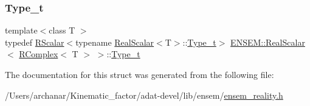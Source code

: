 \subsubsection{\texorpdfstring{Type\_t}{Type\_t}\hspace{0.1cm}{\footnotesize\ttfamily [3/3]}}
{\footnotesize\ttfamily template$<$class T $>$ \\
typedef \mbox{\hyperlink{classENSEM_1_1RScalar}{R\+Scalar}}$<$typename \mbox{\hyperlink{structENSEM_1_1RealScalar}{Real\+Scalar}}$<$T$>$\+::\mbox{\hyperlink{structENSEM_1_1RealScalar_3_01RComplex_3_01T_01_4_01_4_a8e52d83700f12173749eb640b815684c}{Type\+\_\+t}}$>$ \mbox{\hyperlink{structENSEM_1_1RealScalar}{E\+N\+S\+E\+M\+::\+Real\+Scalar}}$<$ \mbox{\hyperlink{classENSEM_1_1RComplex}{R\+Complex}}$<$ T $>$ $>$\+::\mbox{\hyperlink{structENSEM_1_1RealScalar_3_01RComplex_3_01T_01_4_01_4_a8e52d83700f12173749eb640b815684c}{Type\+\_\+t}}}



The documentation for this struct was generated from the following file\+:\begin{DoxyCompactItemize}
\item 
/\+Users/archanar/\+Kinematic\+\_\+factor/adat-\/devel/lib/ensem/\mbox{\hyperlink{adat-devel_2lib_2ensem_2ensem__reality_8h}{ensem\+\_\+reality.\+h}}\end{DoxyCompactItemize}
